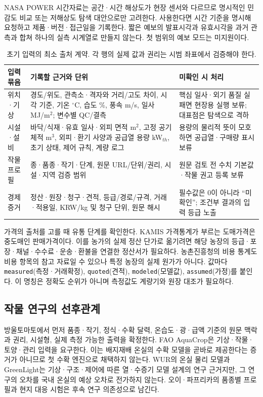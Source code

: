 \documentclass[11pt,a4paper]{article}
\begin{document}
NASA POWER 시간자료는 공간·시간 해상도가 현장 센서와 다르므로 명시적인 민감도 비교 또는 저해상도 탐색 대안으로만 고려한다. 사용한다면 시간 기준을 명시해 요청하고 제품·버전·접근일을 기록한다\cite{nasa-hourly}. 짧은 예보의 발표시각과 유효시각을 과거 관측과 합쳐 하나의 실측 시계열로 만들지 않는다. 첫 범위의 예보 모드는 미지원이다.

\begin{table}[htbp]
\centering\small
\caption{초기 입력의 최소 출처 계약. 각 행의 실제 값과 권리는 시범 좌표에서 검증해야 한다.}
\begin{tabularx}{\textwidth}{p{2.35cm}YY}
\toprule
입력 묶음 & 기록할 근거와 단위 & 미확인 시 처리 \\
\midrule
위치·기상 & 경도/위도, 관측소·격자와 거리/고도 차이, 시각 기준, 기온 $^\circ$C, 습도 \%, 풍속 m/s, 일사 MJ/m$^2$; 변수별 QC/결측 & 핵심 일사·외기 품질 실패면 현장용 실행 보류; 대표점은 탐색으로 격하 \\
시설·설비 & 바닥/식재·유효 일사·외피 면적 m$^2$, 고정 공기 체적 m$^3$, 외피·환기 사양과 공급열 용량 kW$_{th}$, 초기 상태, 제어 규칙, 계량 로그 & 용량의 물리적 뜻이 모호하면 공급열·구매량 표시 보류 \\
작물 프로필 & 종·품종·작기·단계, 원문 URL/단위/권리, 시설·지역 검증 범위 & 원문 검토 전 수치 기본값·작물 권고 등록 보류 \\
경제 증거 & 정산·원장·청구·견적, 등급/경로/규격, 거래·적용일, KRW/kg 및 청구 단위, 원문 해시 & 필수값은 0이 아니라 ``미확인''; 조건부 결과의 입력 등급 노출 \\
\bottomrule
\end{tabularx}
\end{table}

가격의 출처를 고를 때 유통 단계를 확인한다. KAMIS 가격통계가 부르는 도매가격은 중도매인 판매가격이다\cite{kamis}. 이를 농가의 실제 정산 단가로 옮기려면 해당 농장의 등급·포장·채널·수수료·운송·환불을 연결한 정산서가 필요하다. 농촌진흥청의 비용 통계도 비용 항목의 참고 자료일 수 있으나 특정 농장의 실제 원가가 아니다. 값마다 \texttt{measured}(측정·거래확정), \texttt{quoted}(견적), \texttt{modeled}(모델값), \texttt{assumed}(가정)를 붙인다. 이 명칭은 정확도 순위가 아니며 측정값도 계량기와 원장 대조가 필요하다.

\subsection{작물 연구의 선후관계}
방울토마토에서 먼저 품종·작기, 정식·수확 달력, 온습도·광·급액 기준의 원문 맥락과 권리, 시설형, 실제 측정 가능한 출력을 확정한다. FAO AquaCrop은 기상·작물·토양·관리 입력을 요구한다\cite{fao-aquacrop}. 이는 배지재배 온실의 수확 모델을 곧바로 제공한다는 증거가 아니므로 첫 수확 엔진으로 채택하지 않는다. WUR의 온실 물리 모델과 GreenLight는 기상·구조·제어에 따른 열·수증기 모델 설계의 연구 근거지만, 그 연구의 오차를 국내 온실의 예상 오차로 전가하지 않는다\cite{wur-bot,wur-greenlight}. 오이·파프리카의 품종별 프로필과 현지 대응 시험은 후속 연구 의존성으로 남긴다.
\end{document}
